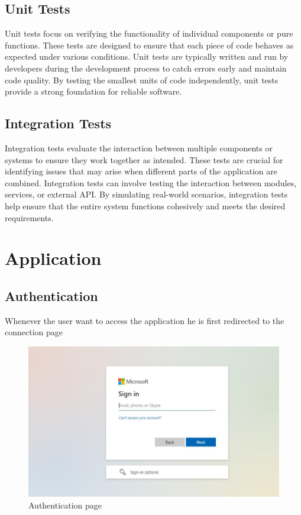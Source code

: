 \documentclass[12pt,a4paper,table,english]{article}
\begin{document}
	
	\subsection{Unit Tests}
	Unit tests focus on verifying the functionality of individual components or pure functions. These tests are designed to ensure that each piece of code behaves as expected under various conditions. Unit tests are typically written and run by developers during the development process to catch errors early and maintain code quality. By testing the smallest units of code independently, unit tests provide a strong foundation for reliable software.
	
	\subsection{Integration Tests}
	Integration tests evaluate the interaction between multiple components or systems to ensure they work together as intended. These tests are crucial for identifying issues that may arise when different parts of the application are combined. Integration tests can involve testing the interaction between modules, services, or external API. By simulating real-world scenarios, integration tests help ensure that the entire system functions cohesively and meets the desired requirements.
	
	\newpage
	
	\section{Application}
	
	\subsection{Authentication}
	Whenever the user want to access the application he is first redirected to the connection page
	
	\begin{figure}[H]
		\centering
		\includegraphics[width=150mm]{Image/authentication}
		\caption{Authentication page}
		\label{fig:Authentication page}
	\end{figure}
\end{document}
